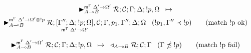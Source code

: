 \begin{multline}
\transx{\matstate{A \lolli B}{\rulestk}{\lstack{C}}{\Gamma}{\Delta}{\bang p,
   \Omega}{\Delta' \rightarrow \Omega'}}
{\matstate{A \lolli B}{\rulestk}{\pframe{\Gamma''}{\Delta}{\bang
   p}{\Omega}{\Delta'}{\Omega'}, \lstack{C}}{\Gamma, p_1,
      \Gamma''}{\Delta}{\Omega}{\Delta' \rightarrow \Omega' \otimes \bang p}}
      \;\;\; (\bang p_1, \Gamma'' \prec \bang p) \tag{match \bang p ok}
\end{multline}

\begin{align}
\trans{\matstate{A \lolli B}{\rulestk}{\lstack{C}}{\Gamma}{\Delta}{\bang p,
   \Omega}{\Delta' \rightarrow \Omega'}}
{\contstate{A \lolli B}{\rulestk}{\lstack{C}}{\Gamma}} \;\;\; (\Gamma \npreceq
      \bang p) \tag{match \bang p fail}
\end{align}
